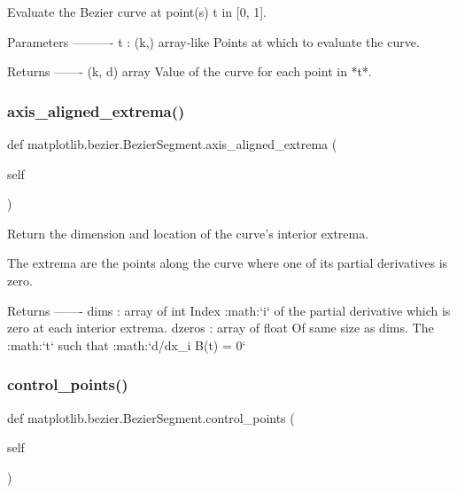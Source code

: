 \begin{DoxyVerb}Evaluate the Bezier curve at point(s) t in [0, 1].

Parameters
----------
t : (k,) array-like
    Points at which to evaluate the curve.

Returns
-------
(k, d) array
    Value of the curve for each point in *t*.
\end{DoxyVerb}
 \mbox{\label{classmatplotlib_1_1bezier_1_1BezierSegment_ac9649690bbcd4e1ee8868a63a679a25b}} 
\subsubsection{\texorpdfstring{axis\+\_\+aligned\+\_\+extrema()}{axis\_aligned\_extrema()}}
{\footnotesize\ttfamily def matplotlib.\+bezier.\+Bezier\+Segment.\+axis\+\_\+aligned\+\_\+extrema (\begin{DoxyParamCaption}\item[{}]{self }\end{DoxyParamCaption})}

\begin{DoxyVerb}Return the dimension and location of the curve's interior extrema.

The extrema are the points along the curve where one of its partial
derivatives is zero.

Returns
-------
dims : array of int
    Index :math:`i` of the partial derivative which is zero at each
    interior extrema.
dzeros : array of float
    Of same size as dims. The :math:`t` such that :math:`d/dx_i B(t) =
    0`
\end{DoxyVerb}
 \mbox{\label{classmatplotlib_1_1bezier_1_1BezierSegment_a778feb95e384072e6acf9e9061bce219}} 
\subsubsection{\texorpdfstring{control\+\_\+points()}{control\_points()}}
{\footnotesize\ttfamily def matplotlib.\+bezier.\+Bezier\+Segment.\+control\+\_\+points (\begin{DoxyParamCaption}\item[{}]{self }\end{DoxyParamCaption})}

